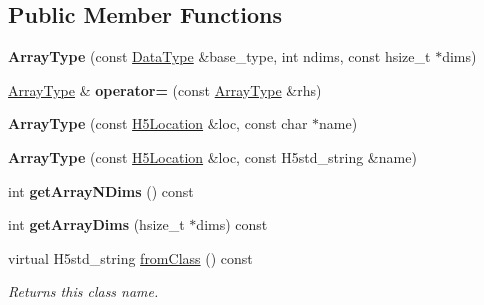 \subsection*{Public Member Functions}
\begin{DoxyCompactItemize}
\item 
\mbox{\label{class_h5_1_1_array_type_a587887d8301ea2991bd60c8472995705}} 
{\bfseries Array\+Type} (const \hyperlink{class_h5_1_1_data_type}{Data\+Type} \&base\+\_\+type, int ndims, const hsize\+\_\+t $\ast$dims)
\item 
\mbox{\label{class_h5_1_1_array_type_ac2fca7c0bbaf3512e612b83cbc1841a6}} 
\hyperlink{class_h5_1_1_array_type}{Array\+Type} \& {\bfseries operator=} (const \hyperlink{class_h5_1_1_array_type}{Array\+Type} \&rhs)
\item 
\mbox{\label{class_h5_1_1_array_type_a006b4d13b11e3d82ecab726a756b4976}} 
{\bfseries Array\+Type} (const \hyperlink{class_h5_1_1_h5_location}{H5\+Location} \&loc, const char $\ast$name)
\item 
\mbox{\label{class_h5_1_1_array_type_aeeef2a9c4be713f968312a23d9fd15e8}} 
{\bfseries Array\+Type} (const \hyperlink{class_h5_1_1_h5_location}{H5\+Location} \&loc, const H5std\+\_\+string \&name)
\item 
\mbox{\label{class_h5_1_1_array_type_afa88edebc3fd8dbcfb589c2144144780}} 
int {\bfseries get\+Array\+N\+Dims} () const
\item 
\mbox{\label{class_h5_1_1_array_type_a9a1e220c180342ea2598be8c8c4400d4}} 
int {\bfseries get\+Array\+Dims} (hsize\+\_\+t $\ast$dims) const
\item 
\mbox{\label{class_h5_1_1_array_type_af1fff9817f1c205a2192241fd79e51c1}} 
virtual H5std\+\_\+string \hyperlink{class_h5_1_1_array_type_af1fff9817f1c205a2192241fd79e51c1}{from\+Class} () const
\begin{DoxyCompactList}\small\item\em Returns this class name. \end{DoxyCompactList}\item 
\mbox{\label{class_h5_1_1_array_type_ac326aa9d5baf6433fc776c5ae8984d3c}} 

\end{DoxyCompactItemize}
